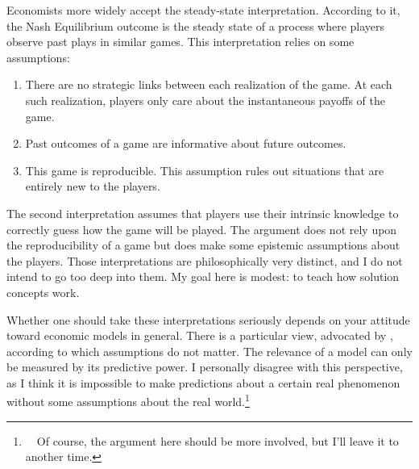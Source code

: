 \documentclass[../../main.tex]{subfiles}
\begin{document}
    Economists more widely accept the steady-state interpretation. According to it, the Nash Equilibrium outcome is the steady state of a process where players observe past plays in similar games. This interpretation relies on some assumptions:
    \begin{enumerate}
        \item There are no strategic links between each realization of the game. At each such realization, players only care about the instantaneous payoffs of the game. 
        \item Past outcomes of a game are informative about future outcomes. 
        \item This game is reproducible. This assumption rules out situations that are entirely new to the players.
    \end{enumerate}

    The second interpretation assumes that players use their intrinsic knowledge to correctly guess how the game will be played. The argument does not rely upon the reproducibility of a game but does make some epistemic assumptions about the players. Those interpretations are philosophically very distinct, and I do not intend to go too deep into them. My goal here is modest: to teach how solution concepts work.

    Whether one should take these interpretations seriously depends on your attitude toward economic models in general. There is a particular view, advocated by \cite{F}, according to which assumptions do not matter. The relevance of a model can only be measured by its predictive power. I personally disagree with this perspective, as I think it is impossible to make predictions about a certain real phenomenon without some assumptions about the real world.\footnote{~~Of course, the argument here should be more involved, but I'll leave it to another time.}
\end{document}
